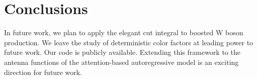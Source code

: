 \section{Conclusions}\label{sec:conclusions}

In future work, we plan to apply the elegant cut integral to boosted W
boson production. We leave the study of deterministic color factors at
leading power to future work. Our code is publicly available. Extending
this framework to the antenna functions of the attention-based
autoregressive model is an exciting direction for future work.

